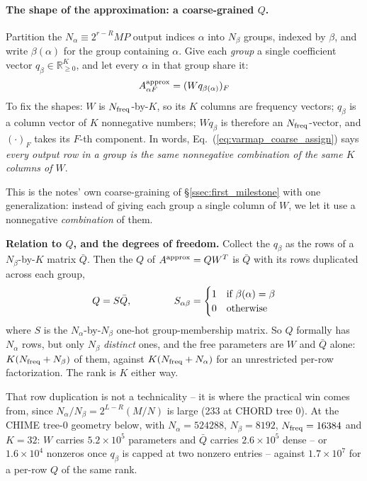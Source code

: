 \documentclass{article}
\numberwithin{equation}{section}   %
\begin{document}
\paragraph*{The shape of the approximation: a coarse-grained $Q$.}
Partition the $N_\alpha \equiv 2^{r-R}MP$ output indices $\alpha$ into $N_\beta$ groups, indexed by
$\beta$, and write $\beta(\alpha)$ for the group containing $\alpha$. Give each {\em group} a
single coefficient vector $q_\beta \in \mathbb{R}^K_{\ge 0}$, and let every $\alpha$ in that
group share it:
\begin{equation}
A^{\rm approx}_{\alpha F} = (W q_{\beta(\alpha)})_F
\label{eq:varmap_coarse_assign}
\end{equation}
To fix the shapes: $W$ is $N_{\rm freq}$-by-$K$, so its $K$ columns are frequency vectors;
$q_\beta$ is a column vector of $K$ nonnegative numbers; $W q_\beta$ is
therefore an $N_{\rm freq}$-vector, and $(\cdot)_F$ takes its $F$-th component. In words,
Eq.\ (\ref{eq:varmap_coarse_assign}) says {\em every output row in a group is the same
nonnegative combination of the same $K$ columns of $W$}.

This is the notes' own coarse-graining of \S\ref{ssec:first_milestone} with one generalization:
instead of giving each group a single column of $W$, we let it use a nonnegative
{\em combination} of them.

{\bf Relation to $Q$, and the degrees of freedom.} Collect the $q_\beta$ as the rows of a
$N_\beta$-by-$K$ matrix $\bar Q$. Then the $Q$ of $A^{\rm approx} = QW^T$ is $\bar Q$ with its rows
duplicated across each group,
\begin{equation}
Q = S \bar Q,
\hspace{1.5cm}
S_{\alpha\beta} = \begin{cases} 1 & \mbox{if $\beta(\alpha) = \beta$} \\ 0 & \mbox{otherwise}\end{cases}
\label{eq:varmap_qbar}
\end{equation}
where $S$ is the $N_\alpha$-by-$N_\beta$ one-hot group-membership matrix. So $Q$ formally has
$N_\alpha$ rows, but only $N_\beta$ {\em distinct} ones, and the free parameters are $W$ and
$\bar Q$ alone: $K(N_{\rm freq} + N_\beta)$ of them, against $K(N_{\rm freq} + N_\alpha)$ for an
unrestricted per-row factorization. The rank is $K$ either way.

That row duplication is not a technicality -- it is where the practical win comes from, since
$N_\alpha / N_\beta = 2^{L-R} (M/N)$ is large (233 at CHORD tree 0). At the CHIME tree-0 geometry
below, with $N_\alpha = 524288$, $N_\beta = 8192$, $N_{\rm freq} = 16384$ and $K = 32$: $W$ carries
$5.2\times10^5$ parameters and $\bar Q$ carries $2.6\times10^5$ dense -- or $1.6\times10^4$
nonzeros once $q_\beta$ is capped at two nonzero entries -- against $1.7\times10^7$ for a
per-row $Q$ of the same rank.
\end{document}
